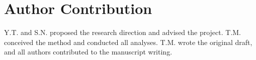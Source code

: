 \section*{Author Contribution}
Y.T. and S.N. proposed the research direction and advised the project. T.M. conceived the method and conducted all analyses. T.M. wrote the original draft, and all authors contributed to the manuscript writing.